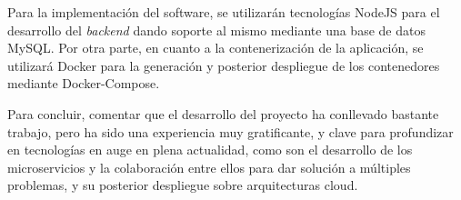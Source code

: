 Para la implementación del software, se utilizarán tecnologías NodeJS
para el desarrollo del \emph{backend} dando soporte al mismo mediante
una base de datos MySQL. Por otra parte, en cuanto a la
contenerización de la aplicación, se utilizará Docker para la
generación y posterior
despliegue\cite{InitMySQLDocker,MYSQL-DOckerHUB,Docean-docker,Docean-dockerCompose}
de los contenedores mediante Docker-Compose.

Para concluir, comentar que el desarrollo del proyecto ha conllevado
bastante trabajo, pero ha sido una experiencia muy gratificante, y
clave para profundizar en tecnologías en auge en plena actualidad,
como son el desarrollo de los microservicios y la colaboración entre
ellos para dar solución a múltiples problemas, y su posterior
despliegue sobre arquitecturas cloud.

